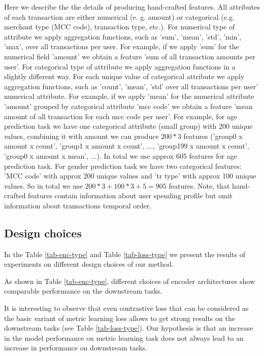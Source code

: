 \documentclass{article}
\begin{document}
Here we describe the the details of producing hand-crafted features. All attributes of each transaction are either numerical (e. g. amount) or categorical (e.g. merchant type (MCC code), transaction type, etc.). 
For numerical type of attribute we apply aggregation functions, such as 'sum', 'mean', 'std', 'min', 'max', over all transactions per user. For example, if we apply 'sum' for the numerical field 'amount' we obtain a feature 'sum of all transaction amounts per user'. 
For categorical type of attribute we apply aggregation functions in a slightly different way. For each unique value of categorical attribute we apply aggregation functions, such as 'count', 'mean', 'std' over all transactions per user' numerical attribute. For example, if we apply 'mean' for the numerical attribute 'amount' grouped by categorical attribute 'mcc code' we obtain a feature 'mean amount of all transaction for each mcc code per user'. 
For example, for age prediction task we have one categorical attribute (small group) with 200 unique values, combining it with amount we can produce $200 * 3$ features ('group0 x amount x count',  'group1 x amount x count', ..., 'group199 x amount x count', 'group0 x amount x mean', ...). In total we use approx 605 features for age prediction task. For gender prediction task we have two categorical features: 'MCC code' with approx 200 unique values and 'tr type' with approx 100 unique values. So in total we use $200 * 3 + 100 * 3 + 5 = 905$ features.
Note, that hand-crafted features contain information about user spending profile but omit information about transactions temporal order.

\subsection{Design choices} \label{app-sec-design}

In the Table \ref{tab-enc-type} and Table \ref{tab-loss-type} we present the results of experiments on different design choices of our method.

As shown in Table \ref{tab-enc-type}, different choices of encoder architectures show comparable performance on the downstream tasks.

It is interesting to observe that even contrastive loss that can be considered as the basic variant of metric learning loss allows to get strong results on the downstream tasks (see Table \ref{tab-loss-type}). Our hypothesis is that an increase in the model performance on metric learning task does not always lead to an increase in performance on downstream tasks.
\end{document}

